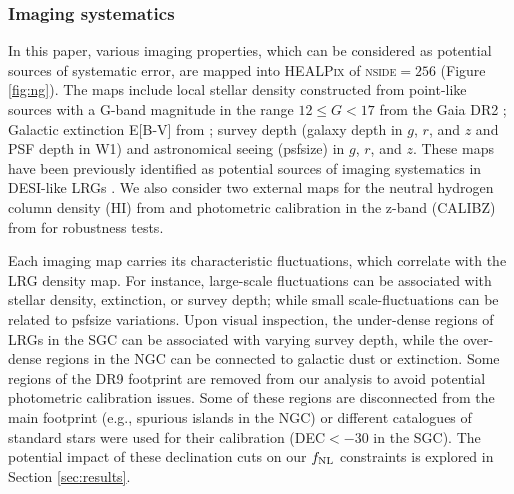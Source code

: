 \subsubsection{Imaging systematics}
In this paper, various imaging properties, which can be considered as potential sources of systematic error, are mapped into \textsc{HEALPix} of \textsc{nside}$=256$ (Figure \ref{fig:ng}). The maps include local stellar density constructed from point-like sources with a G-band magnitude in the range $12 \leq G < 17$ from the Gaia DR2 \citep[see,][]{gaiadr2, myers2022}; Galactic extinction E[B-V] from \cite{schlegel1998maps}; survey depth (galaxy depth in $g$, $r$, and $z$ and PSF depth in W1) and astronomical seeing (psfsize) in $g$, $r$, and $z$. These maps have been previously identified as potential sources of imaging systematics in DESI-like LRGs \citep{zhou2022target}. We also consider two external maps for the neutral hydrogen column density (HI) from \cite{2016A&A...594A.116H} and photometric calibration in the z-band (CALIBZ) from  for robustness tests. %

Each imaging map carries its characteristic fluctuations, which correlate with the LRG density map. For instance, large-scale fluctuations can be associated with stellar density, extinction, or survey depth; while small scale-fluctuations can be related to psfsize variations. Upon visual inspection, the under-dense regions of LRGs in the SGC can be associated with varying survey depth, while the over-dense regions in the NGC can be connected to galactic dust or extinction. Some regions of the DR9 footprint are removed from our analysis to avoid potential photometric calibration issues. Some of these regions are disconnected from the main footprint (e.g., spurious islands in the NGC) or different catalogues of standard stars were used for their calibration (DEC$<-30$ in the SGC). The potential impact of these declination cuts on our $f_{\rm NL}$ constraints is explored in Section \ref{sec:results}. 

